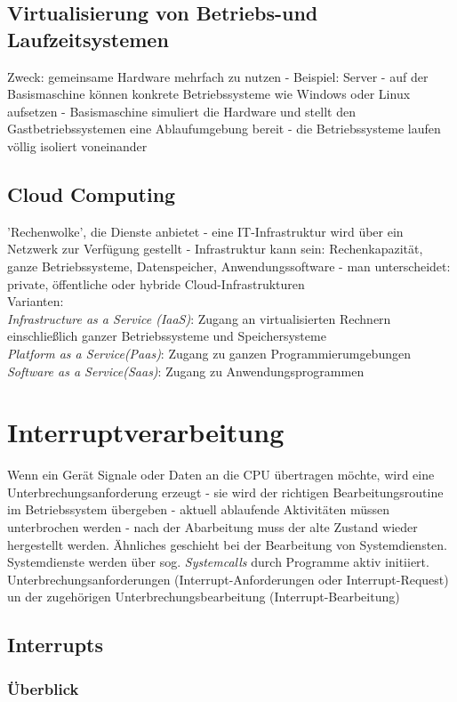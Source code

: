 \documentclass[10pt,a4paper,landscape]{article}
\begin{document}
\begin{multicols*}{3}
	\subsection{Virtualisierung von Betriebs-und Laufzeitsystemen}
	Zweck: gemeinsame Hardware mehrfach zu nutzen - Beispiel: Server - auf der Basismaschine können konkrete Betriebssysteme wie Windows oder Linux aufsetzen - Basismaschine simuliert die Hardware und stellt den Gastbetriebssystemen eine Ablaufumgebung bereit - die Betriebssysteme laufen völlig isoliert voneinander
	\subsection{Cloud Computing}
	'Rechenwolke', die Dienste anbietet - eine IT-Infrastruktur wird über ein Netzwerk zur Verfügung gestellt - Infrastruktur kann sein: Rechenkapazität, ganze Betriebssysteme, Datenspeicher, Anwendungssoftware - man unterscheidet: private, öffentliche oder hybride Cloud-Infrastrukturen\\
	Varianten:\\
	\textit{Infrastructure as a Service (IaaS)}: Zugang an virtualisierten Rechnern einschließlich ganzer Betriebssysteme und Speichersysteme\\
	\textit{Platform as a Service(Paas)}: Zugang zu ganzen Programmierumgebungen\\
	\textit{Software as a Service(Saas)}: Zugang zu Anwendungsprogrammen
	\section{Interruptverarbeitung}
	Wenn ein Gerät Signale oder Daten an die CPU übertragen möchte, wird eine Unterbrechungsanforderung erzeugt - sie wird der richtigen Bearbeitungsroutine im Betriebssystem übergeben - aktuell ablaufende Aktivitäten müssen unterbrochen werden - nach der Abarbeitung muss der alte Zustand wieder hergestellt werden. Ähnliches geschieht bei der Bearbeitung von Systemdiensten. Systemdienste werden über sog. \textit{Systemcalls} durch Programme aktiv initiiert. Unterbrechungsanforderungen (Interrupt-Anforderungen oder Interrupt-Request) un der zugehörigen Unterbrechungsbearbeitung (Interrupt-Bearbeitung)
	\subsection{Interrupts}
	\subsubsection{Überblick}

\end{multicols*}
\end{document}
